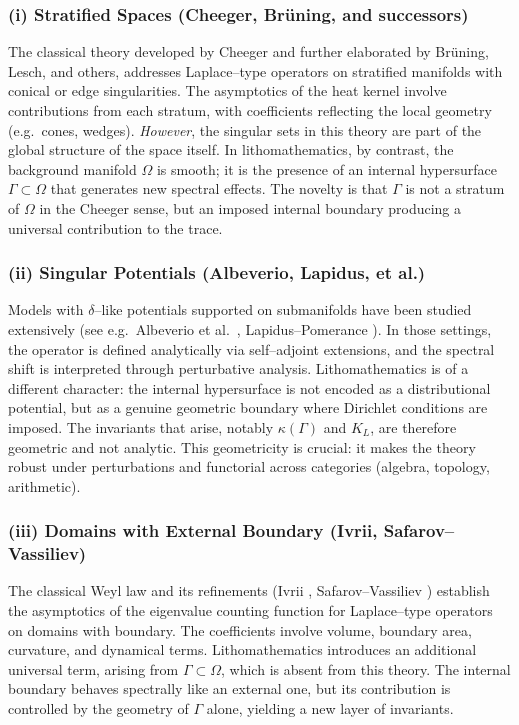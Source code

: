 \subsubsection*{(i) Stratified Spaces (Cheeger, Brüning, and successors)}
The classical theory developed by Cheeger \cite{Cheeger80,Cheeger83} 
and further elaborated by Brüning, Lesch, and others, 
addresses Laplace--type operators on stratified manifolds with conical or 
edge singularities. The asymptotics of the heat kernel involve contributions 
from each stratum, with coefficients reflecting the local geometry 
(e.g.\ cones, wedges). 
\emph{However}, the singular sets in this theory are part of the global 
structure of the space itself. 
In lithomathematics, by contrast, the background manifold $\Omega$ is smooth; 
it is the presence of an internal hypersurface $\Gamma \subset \Omega$ 
that generates new spectral effects. 
The novelty is that $\Gamma$ is not a stratum of $\Omega$ in the Cheeger sense, 
but an imposed internal boundary producing a universal contribution to the trace. 

\subsubsection*{(ii) Singular Potentials (Albeverio, Lapidus, et al.)}
Models with $\delta$--like potentials supported on submanifolds 
have been studied extensively (see e.g.\ Albeverio et al.\ \cite{Albeverio05}, 
Lapidus--Pomerance \cite{Lapidus93}). 
In those settings, the operator is defined analytically 
via self--adjoint extensions, and the spectral shift is interpreted 
through perturbative analysis. 
Lithomathematics is of a different character: 
the internal hypersurface is not encoded as a distributional potential, 
but as a genuine geometric boundary where Dirichlet conditions are imposed. 
The invariants that arise, notably $\kappa(\Gamma)$ and $K_L$, 
are therefore geometric and not analytic. 
This geometricity is crucial: it makes the theory robust under perturbations 
and functorial across categories (algebra, topology, arithmetic).

\subsubsection*{(iii) Domains with External Boundary (Ivrii, Safarov–Vassiliev)}
The classical Weyl law and its refinements (Ivrii \cite{Ivrii80}, 
Safarov--Vassiliev \cite{Safarov97}) 
establish the asymptotics of the eigenvalue counting function for 
Laplace--type operators on domains with boundary. 
The coefficients involve volume, boundary area, curvature, and dynamical terms. 
Lithomathematics introduces an additional universal term, 
arising from $\Gamma \subset \Omega$, which is absent from this theory. 
The internal boundary behaves spectrally like an external one, 
but its contribution is controlled by the geometry of $\Gamma$ alone, 
yielding a new layer of invariants.

